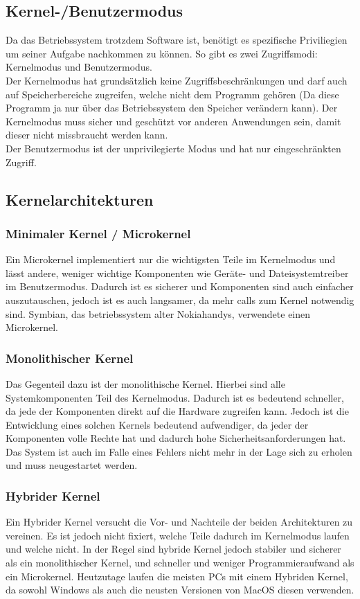 \documentclass{article}
\begin{document}
	\subsection{Kernel-/Benutzermodus}
	Da das Betriebssystem trotzdem Software ist, benötigt es spezifische Priviliegien um seiner Aufgabe nachkommen zu können. So gibt es zwei Zugriffsmodi: Kernelmodus und Benutzermodus. \\
	Der Kernelmodus hat grundsätzlich keine Zugriffsbeschränkungen und darf auch auf Speicherbereiche zugreifen, welche nicht dem Programm gehören (Da diese Programm ja nur über das Betriebssystem den Speicher verändern kann). Der Kernelmodus muss sicher und geschützt vor anderen Anwendungen sein, damit dieser nicht missbraucht werden kann. \\
	Der Benutzermodus ist der unprivilegierte Modus und hat nur eingeschränkten Zugriff.
	\subsection{Kernelarchitekturen}
	\subsubsection{Minimaler Kernel / Microkernel}
	Ein Microkernel implementiert nur die wichtigsten Teile im Kernelmodus und lässt andere, weniger wichtige Komponenten wie Geräte- und Dateisystemtreiber im Benutzermodus. Dadurch ist es sicherer und Komponenten sind auch einfacher auszutauschen, jedoch ist es auch langsamer, da mehr calls zum Kernel notwendig sind. Symbian, das betriebssystem alter Nokiahandys, verwendete einen Microkernel.
	\subsubsection{Monolithischer Kernel}
	Das Gegenteil dazu ist der monolithische Kernel. Hierbei sind alle Systemkomponenten Teil des Kernelmodus. Dadurch ist es bedeutend schneller, da jede der Komponenten direkt auf die Hardware zugreifen kann. Jedoch ist die Entwicklung eines solchen Kernels bedeutend aufwendiger, da jeder der Komponenten volle Rechte hat und dadurch hohe Sicherheitsanforderungen hat. Das System ist auch im Falle eines Fehlers nicht mehr in der Lage sich zu erholen und muss neugestartet werden.
	\subsubsection{Hybrider Kernel}
	Ein Hybrider Kernel versucht die Vor- und Nachteile der beiden Architekturen zu vereinen. Es ist jedoch nicht fixiert, welche Teile dadurch im Kernelmodus laufen und welche nicht. In der Regel sind hybride Kernel jedoch stabiler und sicherer als ein monolithischer Kernel, und schneller und weniger Programmieraufwand als ein Microkernel. Heutzutage laufen die meisten PCs mit einem Hybriden Kernel, da sowohl Windows als auch die neusten Versionen von MacOS diesen verwenden.
\end{document}
